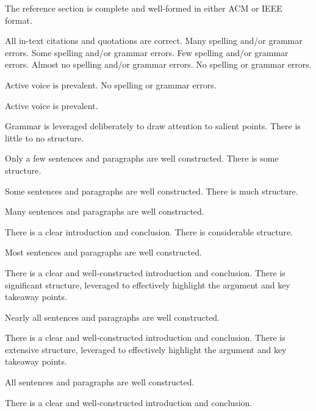 \documentclass{../fal_assignment}
\begin{document}
\begin{markingrubric}
        \par 		The reference section is complete and well-formed in either ACM or IEEE format.
        \par 		All in-text citations and quotations are correct.
%
        \grade  \fail	Many spelling and/or grammar errors.
        \grade 		Some spelling and/or grammar errors.  
        \grade 		Few spelling and/or grammar errors.
        \grade 		Almost no spelling and/or grammar errors.
        \grade 		No spelling or grammar errors.
        \par 		Active voice is prevalent.
        \grade 		No spelling or grammar errors.
        \par 		Active voice is prevalent.
        \par 		Grammar is leveraged deliberately to draw attention to salient points.     
%
        \grade \fail	There is little to no structure.
        \par 		Only a few sentences and paragraphs are well constructed.
        \grade 		There is some structure.
        \par 		Some sentences and paragraphs are well constructed.
        \grade 		There is much structure.
        \par 		Many sentences and paragraphs are well constructed.
        \par 		There is a clear introduction and conclusion.
        \grade 		There is considerable structure.
        \par 		Most sentences and paragraphs are well constructed.
        \par 		There is a clear and well-constructed introduction and conclusion.
        \grade 		There is significant structure, leveraged to effectively highlight the argument and key takeaway points.
        \par 		Nearly all sentences and paragraphs are well constructed.
        \par 		There is a clear and well-constructed introduction and conclusion.
        \grade 		There is extensive structure, leveraged to effectively highlight the argument and key takeaway points.
        \par 		All sentences and paragraphs are well constructed.
        \par 		There is a clear and well-constructed introduction and conclusion.
\end{markingrubric}
\end{document}
